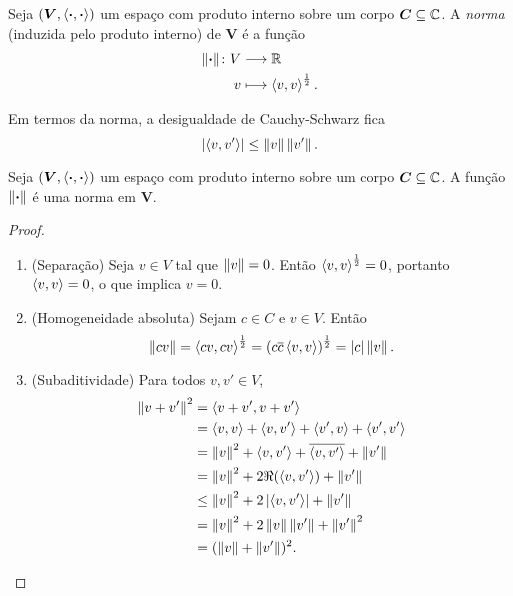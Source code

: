 \begin{definition}
Seja $(\bm V,\inte{\var}{\var})$ um espaço com produto interno sobre um corpo $\bm C \subseteq \C$. A \emph{norma} (induzida pelo produto interno) de $\bm V$ é a função
	\begin{align*}
	\func{\nor{\var}}{V}{\R}{v}{\inte{v}{v}^{\frac{1}{2}}}.
	\end{align*}
\end{definition}

Em termos da norma, a desigualdade de Cauchy-Schwarz fica
	\begin{equation*}
	\abs{\inte{v}{v'}} \leq \nor{v}\nor{v'}.
	\end{equation*}

\begin{proposition}
Seja $(\bm V,\inte{\var}{\var})$ um espaço com produto interno sobre um corpo $\bm C \subseteq \C$. A função $\nor{\var}$ é uma norma em $\bm V$.
\end{proposition}
\begin{proof}
	\begin{enumerate}
	\item (Separação) Seja $v \in V$ tal que $\nor{v}=0$. Então $\inte{v}{v}^\frac{1}{2}=0$, portanto $\inte{v}{v}=0$, o que implica $v=0$.

	\item (Homogeneidade absoluta) Sejam $c \in C$ e $v \in V$. Então
	\begin{equation*}
	\nor{cv} = \inte{cv}{cv}^{\frac{1}{2}} = \left(c\conju{c}\inte{v}{v}\right)^{\frac{1}{2}} = \abs{c}\nor{v}.
	\end{equation*}
	
	\item (Subaditividade) Para todos $v,v' \in V$,
	\begin{align*}
	\nor{v+v'}^2 &= \inte{v+v'}{v+v'} \\
		&= \inte{v}{v}+\inte{v}{v'}+\inte{v'}{v}+\inte{v'}{v'} \\
		&=  \nor{v}^2+\inte{v}{v'}+\conju{\inte{v}{v'}}+\nor{v'}\\
		&= \nor{v}^2+2\Re(\inte{v}{v'})+\nor{v'}\\
		&\leq \nor{v}^2+2\abs{\inte{v}{v'}}+\nor{v'}\\
		&= \nor{v}^2 + 2\nor{v}\nor{v'}+\nor{v'}^2 \\
		&= (\nor{v} + \nor{v'})^2. \qedhere
	\end{align*}
	\end{enumerate}
\end{proof}

